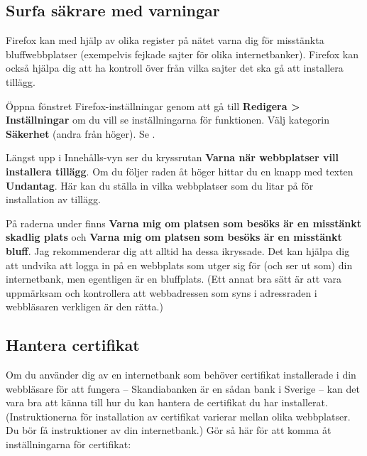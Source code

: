 \documentclass[a4paper,final]{memoir} %
\begin{document}
\subsection{Surfa säkrare med varningar}


Firefox kan med hjälp av olika register på nätet varna dig för misstänkta bluffwebbplatser (exempelvis fejkade sajter för olika internetbanker). Firefox kan också hjälpa dig att ha kontroll över från vilka sajter det ska gå att installera tillägg.

Öppna fönstret Firefox-inställningar genom att gå till \textbf{Redigera \textgreater{} Inställningar} om du vill se inställningarna för funktionen. Välj kategorin \textbf{Säkerhet} (andra från höger). Se .


Längst upp i Innehålls-vyn ser du kryssrutan \textbf{Varna när webbplatser vill installera tillägg}. Om du följer raden åt höger hittar du en knapp med texten \textbf{Undantag}. Här kan du ställa in vilka webbplatser som du litar på för installation av tillägg. 

På raderna under finns \textbf{Varna mig om platsen som besöks är en misstänkt skadlig plats} och \textbf{Varna mig om platsen som besöks är en misstänkt bluff}. Jag rekommenderar dig att alltid ha dessa ikryssade. Det kan hjälpa dig att undvika att logga in på en webbplats som utger sig för (och ser ut som) din internetbank, men egentligen är en bluffplats. (Ett annat bra sätt är att vara uppmärksam och kontrollera att webbadressen som syns i adressraden i webbläsaren verkligen är den rätta.)


\subsection{Hantera certifikat}


Om du använder dig av en internetbank som behöver certifikat installerade i din webbläsare för att fungera -- Skandiabanken är en sådan bank i Sverige -- kan det vara bra att känna till hur du kan hantera de certifikat du har installerat. (Instruktionerna för installation av certifikat varierar mellan olika webbplatser. Du bör få instruktioner av din internetbank.) Gör så här för att komma åt inställningarna för certifikat:
\end{document}
